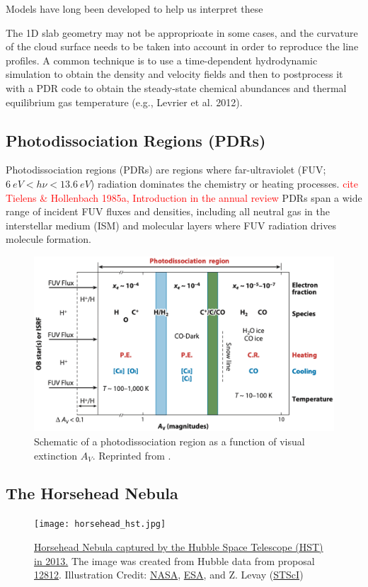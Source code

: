 \documentclass[12pt,a4paper]{article}
\newcommand{\qt}[1]{\textcolor{red}{#1}}
\begin{document}
Models have long been developed to help us interpret these


The 1D slab geometry may not be approprioate in some cases, and the curvature of the cloud surface needs to be taken into account in order to reproduce the line profiles. A common technique is to use a time-dependent hydrodynamic simulation to obtain the density and velocity fields and then to postprocess it with a PDR code to obtain the steady-state chemical abundances and thermal equilibrium gas temperature (e.g., Levrier et al. 2012).

\subsection{Photodissociation Regions (PDRs)}
Photodissociation regions (PDRs) are regions where far-ultraviolet (FUV; $\qty{6}{eV} < h\nu < \qty{13.6}{eV}$) radiation dominates the chemistry or heating processes. \qt{cite Tielens \& Hollenbach 1985a, Introduction in the annual review} PDRs span a wide range of incident FUV fluxes and densities, including all neutral gas in the interstellar medium (ISM) and molecular layers where FUV radiation drives molecule formation.

\begin{figure}
    \centering
    \includegraphics[width=.7\textwidth,keepaspectratio]{figures/PDRScheme_Wolfire2022fig2.png}
    \caption{Schematic of a photodissociation region as a function of visual extinction $A_V$. Reprinted from \textcite{Wolfire_2022}.}
\end{figure}
\subsection{The Horsehead Nebula}
\begin{figure}
    \centering
    \texttt{[image: horsehead\_hst.jpg]}
    \caption{\href{https://hubblesite.org/contents/media/images/2013/12/3166-Image.html?keyword=Horsehead}{Horsehead Nebula captured by the Hubble Space Telescope (HST) in 2013.} The image was created from Hubble data from proposal \href{http://archive.stsci.edu/proposal_search.php?mission=hst&id=12812}{12812}. Illustration Credit: \href{http://www.nasa.gov/}{NASA}, \href{http://www.spacetelescope.org/}{ESA}, and Z. Levay (\href{http://www.stsci.edu/}{STScI})} 
\end{figure}
\end{document}
